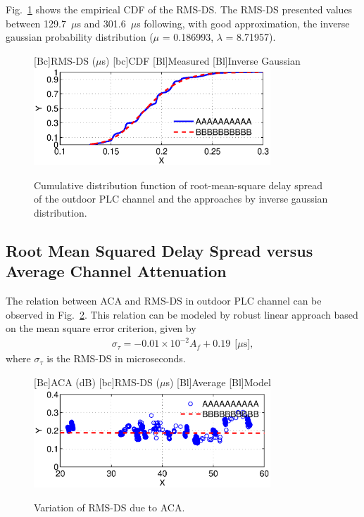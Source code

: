 \documentclass[journal]{IEEEtran}
\newcommand{\tamfig}{3.5in}    %
\begin{document}
	Fig.~\ref{Fig:RMSDS_CDF} shows the empirical \ac{CDF} of the RMS-DS. The RMS-DS presented values between 129.7~$\mu$s and 301.6~$\mu$s following, with good approximation, the inverse gaussian probability distribution ($\mu$ = 0.186993, $\lambda$ = 8.71957).
	\begin{figure}[!htp]
		\begin{centering}
			[Bc]{RMS-DS ($\mu$s)}    
			[bc]{CDF}
			[Bl]{Measured}
			[Bl]{Inverse Gaussian}
			\includegraphics[width=\tamfig]{Figuras/RMSDS_CDF.eps}
			\caption{Cumulative distribution function of root-mean-square delay spread of the outdoor \ac{PLC} channel and the approaches by inverse gaussian distribution.}
			\label{Fig:RMSDS_CDF}
		\end{centering}
	\end{figure}
	
	
	\subsection{Root Mean Squared Delay Spread versus Average Channel Attenuation}
	The relation between ACA and RMS-DS in outdoor \ac{PLC} channel can be observed in Fig.~\ref{Fig:ACMxRMSDS}. This relation can be modeled by robust linear approach based on the mean square error criterion, given by   
	\begin{eqnarray} \label{eq-ACMxRMSDS}
	\sigma_{\tau} = - 0.01 \times1 0^{-2}A_f + 0.19 \   \  \mbox{[$\mu$s]},    
	\end{eqnarray}
	where $\sigma_{\tau}$ is the RMS-DS in microseconds.
	
	\begin{figure}[!htp]
		\begin{centering}
			[Bc]{ACA (dB)}    
			[bc]{RMS-DS ($\mu$s)}
			[Bl]{Average}
			[Bl]{Model}
			\includegraphics[width=\tamfig]{Figuras/ACGxRMSDS.eps}
			\caption{Variation of RMS-DS due to ACA.}
			\label{Fig:ACMxRMSDS}
		\end{centering}
	\end{figure}
	
\end{document}
